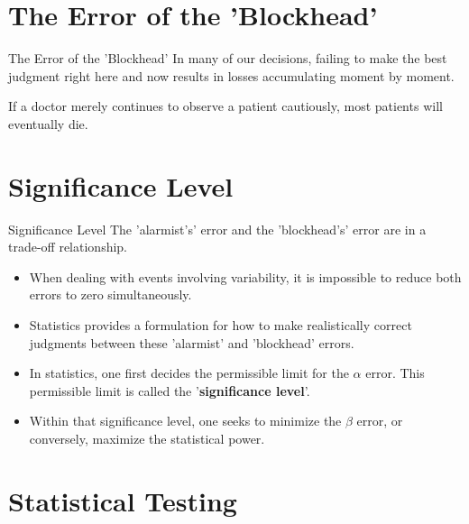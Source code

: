 \documentclass[dvipdfmx, autodetect-engine, aspectratio=169, 10.5pt]{beamer}
\begin{document}
\section{The Error of the 'Blockhead'}

\begin{frame}{The Error of the 'Blockhead'}
	In many of our decisions, failing to make the best judgment right here and now results in losses accumulating moment by moment.

	\vspace{7mm}

	If a doctor merely continues to observe a patient cautiously, most patients will eventually die.
\end{frame}

\section{Significance Level}

\begin{frame}{Significance Level}
	The 'alarmist's' error and the 'blockhead's' error are in a trade-off relationship.
	\begin{itemize}
		\item When dealing with events involving variability, it is impossible to reduce both errors to zero simultaneously.
		      \vspace{5mm}
		\item Statistics provides a formulation for how to make realistically correct judgments between these 'alarmist' and 'blockhead' errors.
		      \vspace{5mm}
		\item In statistics, one first decides the permissible limit for the $\alpha$ error. This permissible limit is called the '\textbf{significance level}'.
		\item Within that significance level, one seeks to minimize the $\beta$ error, or conversely, maximize the statistical power.
	\end{itemize}
\end{frame}

\section{Statistical Testing}
\end{document}

